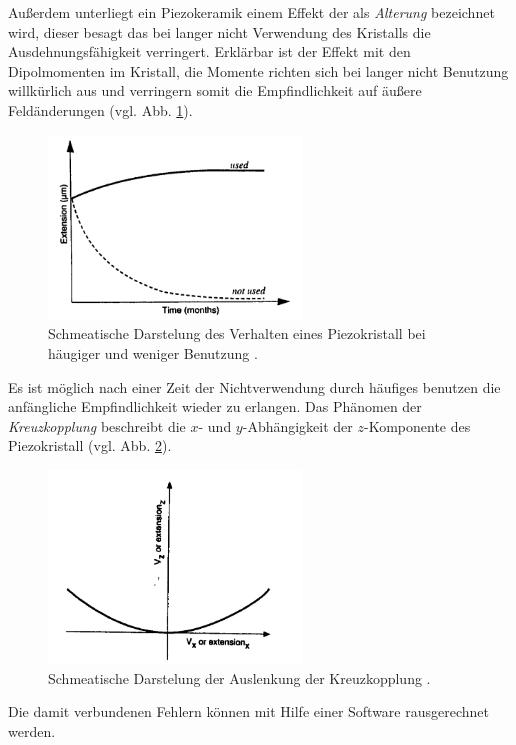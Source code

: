 Außerdem unterliegt ein Piezokeramik einem Effekt der als \emph{Alterung} bezeichnet wird, dieser besagt
das bei langer nicht Verwendung des Kristalls die Ausdehnungsfähigkeit verringert. Erklärbar ist der Effekt mit den
Dipolmomenten im Kristall, die Momente richten sich bei langer nicht Benutzung willkürlich aus und verringern
somit die Empfindlichkeit auf äußere Feldänderungen (vgl. Abb. \ref{fig: ageing}).
\begin{figure}[!h]
  \centering
  \includegraphics[width=0.6\textwidth]{./pics/ageing.png}
  \caption{Schmeatische Darstelung des Verhalten eines Piezokristall bei häugiger und weniger Benutzung \cite{rtm}.}
  \label{fig: ageing}
\end{figure}
Es ist möglich nach einer Zeit der Nichtverwendung
durch häufiges benutzen die anfängliche Empfindlichkeit wieder zu erlangen.
Das Phänomen der \emph{Kreuzkopplung} beschreibt die $x$- und $y$-Abhängigkeit der $z$-Komponente des Piezokristall (vgl. Abb. \ref{fig: cross_copeling}).
\begin{figure}[!h]
  \centering
  \includegraphics[width=0.6\textwidth]{./pics/cross_copling.png}
  \caption{Schmeatische Darstelung der Auslenkung der Kreuzkopplung \cite{rtm}.}
  \label{fig: cross_copeling}
\end{figure}
Die damit verbundenen Fehlern können mit Hilfe einer Software rausgerechnet werden.

